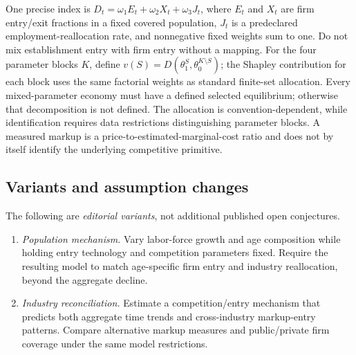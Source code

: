 \documentclass[11pt,a4paper]{article}
\begin{document}
One precise index is \(D_t=\omega_1 E_t+\omega_2 X_t+\omega_3J_t\), where \(E_t\) and \(X_t\) are firm entry/exit fractions in a fixed covered population, \(J_t\) is a predeclared employment-reallocation rate, and nonnegative fixed weights sum to one. Do not mix establishment entry with firm entry without a mapping. For the four parameter blocks \(K\), define \(v(S)=D(\theta_1^S,\theta_0^{K\setminus S})\); the Shapley contribution for each block uses the same factorial weights as standard finite-set allocation. Every mixed-parameter economy must have a defined selected equilibrium; otherwise that decomposition is not defined. The allocation is convention-dependent, while identification requires data restrictions distinguishing parameter blocks. A measured markup is a price-to-estimated-marginal-cost ratio and does not by itself identify the underlying competitive primitive.
\subsection*{Variants and assumption changes}
The following are \emph{editorial variants}, not additional published open conjectures.
\begin{enumerate}
\item \emph{Population mechanism.} Vary labor-force growth and age composition while holding entry technology and competition parameters fixed. Require the resulting model to match age-specific firm entry and industry reallocation, beyond the aggregate decline.
\item \emph{Industry reconciliation.} Estimate a competition/entry mechanism that predicts both aggregate time trends and cross-industry markup-entry patterns. Compare alternative markup measures and public/private firm coverage under the same model restrictions.
\end{enumerate}
\end{document}
